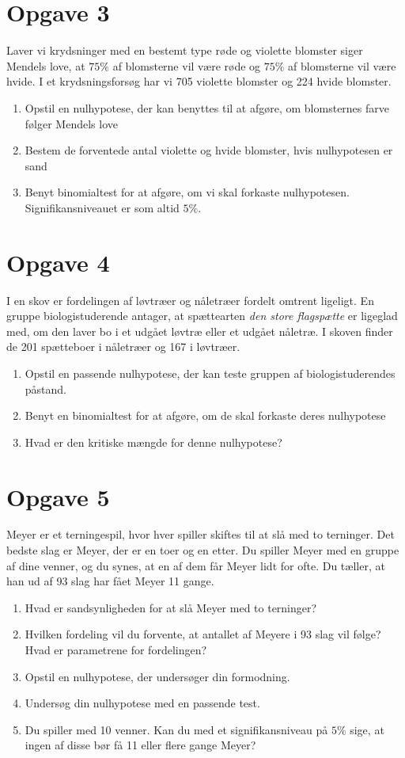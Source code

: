 \section*{Opgave 3}
Laver vi krydsninger med en bestemt type røde og violette blomster siger Mendels love, at $75\%$ af blomsterne vil være røde og $75\%$ af blomsterne vil være hvide. I et krydsningsforsøg har vi 705 violette blomster og 224 hvide blomster. 
\begin{enumerate}[label=\roman*)]
\item Opstil en nulhypotese, der kan benyttes til at afgøre, om blomsternes farve følger Mendels love
\item Bestem de forventede antal violette og hvide blomster, hvis nulhypotesen er sand
\item Benyt binomialtest for at afgøre, om vi skal forkaste nulhypotesen. Signifikansniveauet er som altid $5\%$.
\end{enumerate}

\section*{Opgave 4}
I en skov er fordelingen af løvtræer og nåletræer fordelt omtrent ligeligt. En gruppe biologistuderende antager, at spættearten \textit{den store flagspætte} er ligeglad med, om den laver bo i et udgået løvtræ eller et udgået nåletræ. I skoven finder de 201 spætteboer i nåletræer og 167 i løvtræer. 
\begin{enumerate}[label=\roman*)]
\item Opstil en passende nulhypotese, der kan teste gruppen af biologistuderendes påstand. 
\item Benyt en binomialtest for at afgøre, om de skal forkaste deres nulhypotese
\item Hvad er den kritiske mængde for denne nulhypotese?
\end{enumerate}

\section*{Opgave 5}
Meyer er et terningespil, hvor hver spiller skiftes til at slå med to terninger. Det bedste slag er Meyer, der er en toer og en etter. Du spiller Meyer med en gruppe af dine venner, og du synes, at en af dem får Meyer lidt for ofte. Du tæller, at han ud af 93 slag har fået Meyer 11 gange.
\begin{enumerate}[label=\roman*)]
\item Hvad er sandsynligheden for at slå Meyer med to terninger?
\item Hvilken fordeling vil du forvente, at antallet af Meyere i 93 slag vil følge? Hvad er parametrene for fordelingen?
\item Opstil en nulhypotese, der undersøger din formodning.
\item Undersøg din nulhypotese med en passende test. 
\item Du spiller med 10 venner. Kan du med et signifikansniveau på $5\%$ sige, at ingen af disse bør få 11 eller flere gange Meyer?
\end{enumerate}


